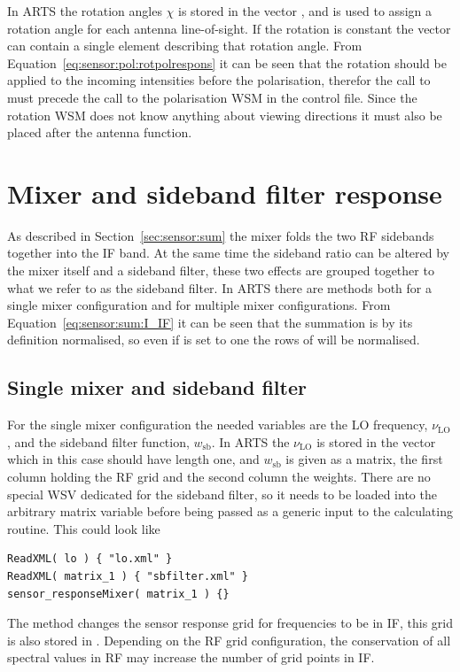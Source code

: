 In ARTS the rotation angles $\chi$ is stored in the vector
, and is used to assign a rotation angle for
each antenna line-of-sight. If the rotation is constant the
 vector can contain a single element describing
that rotation angle. From Equation~\ref{eq:sensor:pol:rotpolrespons}
it can be seen that the rotation should be applied to the incoming
intensities before the polarisation, therefor the call to
 must precede the call to the
polarisation WSM in the control file. Since the rotation WSM does not
know anything about viewing directions it must also be placed after
the antenna function.


\section{Mixer and sideband filter response}
As described in Section~\ref{sec:sensor:sum} the mixer folds the two
RF sidebands together into the IF band. At the same time the sideband
ratio can be altered by the mixer itself and a sideband filter, these
two effects are grouped together to what we refer to as the sideband
filter. In ARTS there are methods both for a single mixer
configuration and for multiple mixer configurations. From
Equation~\ref{eq:sensor:sum:I_IF} it can be seen that the summation is
by its definition normalised, so even if  is
set to one the rows of  will be normalised.

\subsection{Single mixer and sideband filter}
For the single mixer configuration the needed variables are the LO
frequency, $\nu_\mathrm{LO}$, and the sideband filter function,
$w_\mathrm{sb}$. In ARTS the $\nu_\mathrm{LO}$ is stored in the vector
 which in this case should have length one, and
$w_\mathrm{sb}$ is given as a matrix, the first column holding the RF
grid and the second column the weights. There are no special WSV
dedicated for the sideband filter, so it needs to be loaded into the
arbitrary matrix variable  before being passed as
a generic input to the calculating routine. This could look like
\begin{verbatim}
ReadXML( lo ) { "lo.xml" }
ReadXML( matrix_1 ) { "sbfilter.xml" }
sensor_responseMixer( matrix_1 ) {}
\end{verbatim}
The method  changes the sensor
response grid for frequencies to be in IF, this grid is also stored in
. Depending on the RF grid configuration, the
conservation of all spectral values in RF may increase the number of
grid points in IF.

